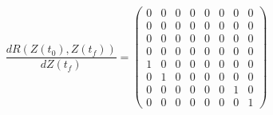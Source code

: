 \begin{itemize}
\begin{equation}
\dfrac{d R(Z(t_0),Z(t_f))}{d Z(t_f)} = \begin{pmatrix}
0 & 0 & 0 & 0 & 0 & 0 & 0 & 0 \\ 
0 & 0 & 0 & 0 & 0 & 0 & 0 & 0 \\ 
0 & 0 & 0 & 0 & 0 & 0 & 0 & 0 \\ 
0 & 0 & 0 & 0 & 0 & 0 & 0 & 0 \\
1 & 0 & 0 & 0 & 0 & 0 & 0 & 0 \\
0 & 1 & 0 & 0 & 0 & 0 & 0 & 0 \\
0 & 0 & 0 & 0 & 0 & 0 & 1 & 0 \\
0 & 0 & 0 & 0 & 0 & 0 & 0 & 1
\end{pmatrix}
\end{equation}
\end{itemize}






















